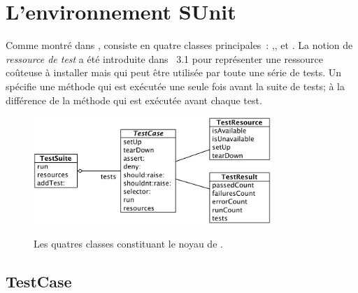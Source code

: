 \documentclass[a4paper,10pt,twoside]{book}
\begin{document}
\section{L'environnement SUnit}

Comme montré dans , \sunit consiste en quatre classes principales~: ,,  et .
La notion de \emph{ressource de test} a été introduite dans \sunit~3.1 pour représenter une ressource coûteuse à installer mais qui peut être utilisée par toute une série de tests. Un  spécifie une méthode  qui est exécutée une seule fois avant la suite de tests; à la différence de la méthode  qui est exécutée avant chaque test.

\begin{figure}[htb]
  \begin{center}
		{\includegraphics[width=0.8\textwidth]{sunit-classes}}
	\caption{Les quatres classes constituant le noyau de \SUnit.}
	\label{fig:sunit-classes}
  \end{center}
\end{figure}


\subsection{TestCase}
\end{document}
